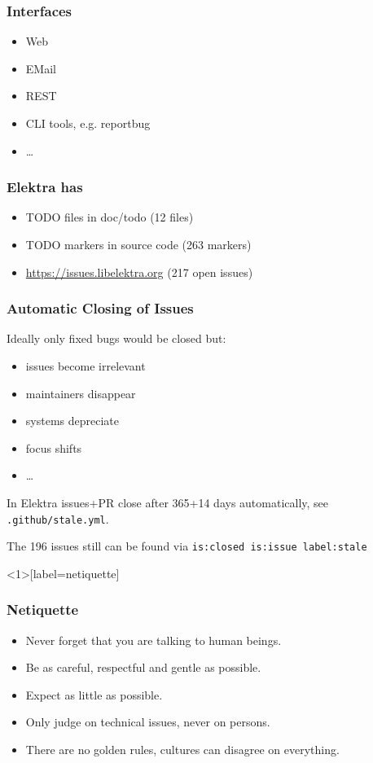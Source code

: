 \begin{frame}
	\frametitle{Interfaces}

	\begin{itemize}
		\item Web
		\item EMail
		\item REST
		\item CLI tools, e.g. reportbug
		\item \dots
	\end{itemize}
\end{frame}

\begin{frame}
	\frametitle{Elektra has}
	\begin{itemize}
		\item TODO files in doc/todo (12 files)
		\item TODO markers in source code (263 markers)
		\item \url{https://issues.libelektra.org} (217 open issues)
	\end{itemize}
\end{frame}

\begin{frame}[fragile]
	\frametitle{Automatic Closing of Issues}

	Ideally only fixed bugs would be closed but:
	\begin{itemize}
		\item issues become irrelevant
		\item maintainers disappear
		\item systems depreciate
		\item focus shifts
		\item \dots
	\end{itemize}
	\vspace{1cm}

	In Elektra issues+PR close after 365+14 days automatically, see
	\verb+.github/stale.yml+.

	\vspace{1cm}
	The 196 issues still can be found via \verb+is:closed is:issue label:stale+
\end{frame}

\begin{frame}<1>[label=netiquette]
	\frametitle{Netiquette}

	\begin{itemize}
		\item Never forget that you are talking to human beings.
		\item Be as careful, respectful and gentle as possible.
		\item Expect as little as possible.
		\item Only judge on technical issues, never on persons.
		\item There are no golden rules, cultures can disagree on everything.
	\end{itemize}

\end{frame}


